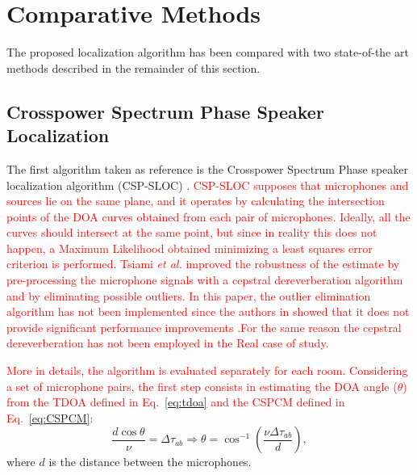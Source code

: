 \documentclass[review]{elsarticle}
\let\originaleqref=\eqref
\renewcommand{\eqref}{Eq.~\originaleqref}
\begin{document}
\section{Comparative Methods}
\label{sec:comp_meth}
The proposed localization algorithm has been compared with two state-of-the art methods described in the remainder of this section.

\subsection{Crosspower Spectrum Phase Speaker Localization}\label{sec:soa_met}
The first algorithm taken as reference is the Crosspower Spectrum Phase speaker localization algorithm (CSP-SLOC) \cite{tsiami2014experiments}. \textcolor{red}{CSP-SLOC supposes that microphones and sources lie on the same plane, and it operates by calculating the intersection points of the DOA curves obtained from each pair of microphones. Ideally, all the curves should intersect at the same point, but since in reality this does not happen, a Maximum Likelihood obtained minimizing a least squares error criterion is performed. Tsiami \textit{et al.} \cite{tsiami2014experiments} improved the robustness of the estimate by pre-processing the microphone signals with a cepstral dereverberation algorithm  and by eliminating possible outliers. In this paper, the outlier elimination algorithm has not been implemented since  the authors in \cite{tsiami2014experiments} showed that it does not provide significant performance improvements .For the same reason the cepstral dereverberation has not been employed in the Real case of study.}

\textcolor{red}{More in details, the algorithm is evaluated separately for each room. Considering a set of microphone pairs, the first step consists in 
estimating the DOA angle ($\theta$) from the TDOA defined in \eqref{eq:tdoa} and the CSPCM defined in \eqref{eq:CSPCM}:}
\begin{equation}\label{eq:doa}
\frac{d \cos \theta}{\nu} = \Delta\tau_{ab}  \Rightarrow \theta = \cos^{-1}  \left( \frac{\nu \Delta\tau_{ab} }{d} \right), 
\end{equation}
where $d$ is the distance between the microphones.
\end{document}
